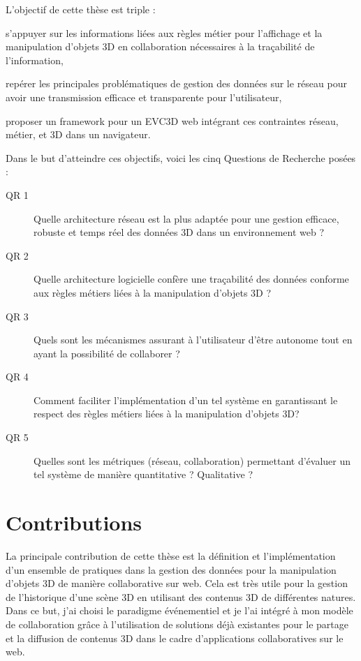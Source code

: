 L'objectif de cette thèse est triple : 
\begin{enumerate*}[label=(\roman*)]
	\item s'appuyer sur les informations liées aux règles métier pour l'affichage et la 
	manipulation d'objets \gls{3D} en collaboration nécessaires à la traçabilité de 
	l'information,
	\item repérer les principales problématiques de gestion des données sur le 
	réseau pour avoir une transmission efficace et transparente pour l'utilisateur,
	\item proposer un \gls{framework} pour un \gls{EVC3D} web intégrant ces 
	contraintes réseau, métier, et \gls{3D} dans un navigateur.
\end{enumerate*}
Dans le but d'atteindre ces objectifs, voici les cinq Questions de Recherche 
posées :
\begin{description}
	\item[QR 1] Quelle architecture réseau est la plus adaptée pour une gestion 
	efficace, robuste et temps réel des données \gls{3D} dans un environnement 
	web ?
	
	\item[QR 2] Quelle architecture logicielle confère une traçabilité des données 
	conforme aux règles métiers liées à la manipulation d'objets \gls{3D} ? 
	
	\item[QR 3] Quels sont les mécanismes assurant à l'utilisateur d'être 
	autonome tout en ayant la possibilité de collaborer ?
	
	
	\item[QR 4] Comment faciliter l'implémentation d'un tel système en garantissant 
	le respect des règles métiers liées à la manipulation d'objets \gls{3D}?
	
	\item[QR 5] Quelles sont les métriques (réseau, collaboration) permettant 
	d'évaluer un tel système de manière quantitative ? Qualitative ? %
	
\end{description}

\section{Contributions}

La principale contribution de cette thèse est la définition et l'implémentation d'un 
ensemble de pratiques dans la gestion des données pour la manipulation d'objets 
3D de manière collaborative sur web. Cela est très utile pour la gestion de 
l'historique d'une scène \gls{3D} en utilisant des contenus \gls{3D} de différentes 
natures. Dans ce but, j'ai choisi le paradigme événementiel et je l'ai 
intégré à mon modèle de collaboration grâce à l'utilisation de solutions 
déjà existantes pour le partage et la diffusion de contenus \gls{3D} dans le cadre 
d'applications collaboratives sur le web.

